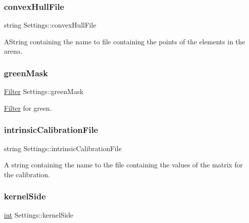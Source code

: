 \mbox{\label{class_settings_aae9ea78e634fee8a76c2eb2b6fd09eeb}} 
\subsubsection{\texorpdfstring{convexHullFile}{convexHullFile}}
{\footnotesize\ttfamily string Settings\+::convex\+Hull\+File}



A\+String containing the name to file containing the points of the elements in the arena. 

\mbox{\label{class_settings_a05138be305e15677c8a84ddf27e4d9e8}} 
\subsubsection{\texorpdfstring{greenMask}{greenMask}}
{\footnotesize\ttfamily \mbox{\hyperlink{class_filter}{Filter}} Settings\+::green\+Mask}



\mbox{\hyperlink{class_filter}{Filter}} for green. 

\mbox{\label{class_settings_a634e9900615e8d5b46b08e0fc86d67a5}} 
\subsubsection{\texorpdfstring{intrinsicCalibrationFile}{intrinsicCalibrationFile}}
{\footnotesize\ttfamily string Settings\+::intrinsic\+Calibration\+File}



A string containing the name to the file containing the values of the matrix for the calibration. 

\mbox{\label{class_settings_a376418be10e2c1067b2d03c08e7b6a92}} 
\subsubsection{\texorpdfstring{kernelSide}{kernelSide}}
{\footnotesize\ttfamily \mbox{\hyperlink{draw_8hh_aa620a13339ac3a1177c86edc549fda9b}{int}} Settings\+::kernel\+Side}


